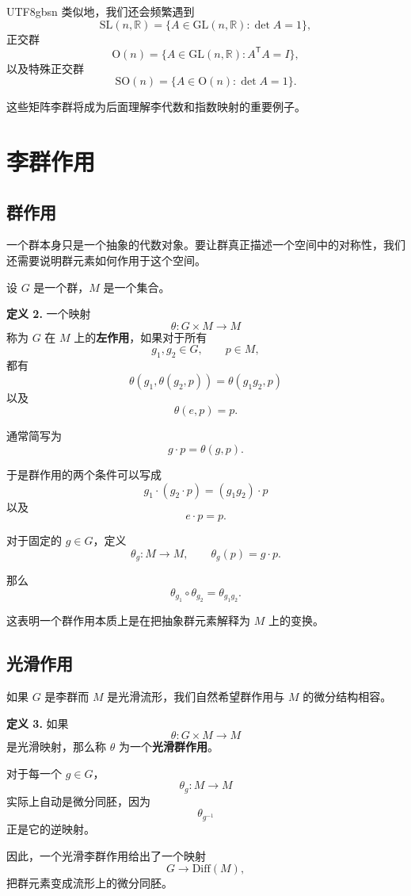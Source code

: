 \documentclass[11pt]{article}
\begin{document}
\begin{CJK*}{UTF8}{gbsn}
类似地，我们还会频繁遇到
\[
\mathrm{SL}(n,\mathbb{R})
=
\{A\in\mathrm{GL}(n,\mathbb{R}):\det A=1\},
\]
正交群
\[
\mathrm{O}(n)
=
\{A\in\mathrm{GL}(n,\mathbb{R}):A^{\mathsf T}A=I\},
\]
以及特殊正交群
\[
\mathrm{SO}(n)
=
\{A\in\mathrm{O}(n):\det A=1\}.
\]

这些矩阵李群将成为后面理解李代数和指数映射的重要例子。


\section{李群作用}

\subsection{群作用}

一个群本身只是一个抽象的代数对象。要让群真正描述一个空间中的对称性，我们还需要说明群元素如何作用于这个空间。

设 $G$ 是一个群，$M$ 是一个集合。

\textbf{定义 2.}
一个映射
\[
\theta:G\times M\to M
\]
称为 $G$ 在 $M$ 上的\textbf{左作用}，如果对于所有
\[
g_1,g_2\in G,
\qquad
p\in M,
\]
都有
\[
\theta(g_1,\theta(g_2,p))
=
\theta(g_1g_2,p)
\]
以及
\[
\theta(e,p)=p.
\]

通常简写为
\[
g\cdot p=\theta(g,p).
\]

于是群作用的两个条件可以写成
\[
g_1\cdot(g_2\cdot p)
=
(g_1g_2)\cdot p
\]
以及
\[
e\cdot p=p.
\]

对于固定的 $g\in G$，定义
\[
\theta_g:M\to M,
\qquad
\theta_g(p)=g\cdot p.
\]

那么
\[
\theta_{g_1}\circ\theta_{g_2}
=
\theta_{g_1g_2}.
\]

这表明一个群作用本质上是在把抽象群元素解释为 $M$ 上的变换。


\subsection{光滑作用}

如果 $G$ 是李群而 $M$ 是光滑流形，我们自然希望群作用与 $M$ 的微分结构相容。

\textbf{定义 3.}
如果
\[
\theta:G\times M\to M
\]
是光滑映射，那么称 $\theta$ 为一个\textbf{光滑群作用}。

对于每一个 $g\in G$，
\[
\theta_g:M\to M
\]
实际上自动是微分同胚，因为
\[
\theta_{g^{-1}}
\]
正是它的逆映射。

因此，一个光滑李群作用给出了一个映射
\[
G\longrightarrow\mathrm{Diff}(M),
\]
把群元素变成流形上的微分同胚。


\end{CJK*}
\end{document}
